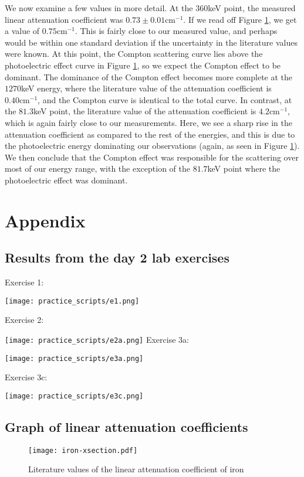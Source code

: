 \documentclass{amsart}
\begin{document}
We now examine a few values in more detail. At the $360$keV point, the measured linear attenuation coefficient was $0.73\pm0.01\text{cm}^{-1}$. If we read off Figure \ref{litiron}, we get a value of $0.75\text{cm}^{-1}$. This is fairly close to our measured value, and perhaps would be within one standard deviation if the uncertainty in the literature values were known. At this point, the Compton scattering curve lies above the photoelectric effect curve in Figure \ref{litiron}, so we expect the Compton effect to be dominant. The dominance of the Compton effect becomes more complete at the $1270$keV energy, where the literature value of the attenuation coefficient is $0.40\text{cm}^{-1}$, and the Compton curve is identical to the total curve. In contrast, at the $81.3$keV point, the literature value of the attenuation coefficient is $4.2\text{cm}^{-1}$, which is again fairly close to our measurements. Here, we see a sharp rise in the attenuation coefficient as compared to the rest of the energies, and this is due to the photoelectric energy dominating our observations (again, as seen in Figure \ref{litiron}). We then conclude that the Compton effect was responsible for the scattering over most of our energy range, with the exception of the $81.7$keV point where the photoelectric effect was dominant.
\newpage
\section{Appendix}
\subsection{Results from the day 2 lab exercises}
Exercise 1:

\texttt{[image: practice\_scripts/e1.png]}

Exercise 2:

\texttt{[image: practice\_scripts/e2a.png]}
\newpage
Exercise 3a:

\texttt{[image: practice\_scripts/e3a.png]}

Exercise 3c:

\texttt{[image: practice\_scripts/e3c.png]}
\subsection{Graph of linear attenuation coefficients}
\begin{figure}
\center
\nopagebreak
\texttt{[image: iron-xsection.pdf]}
\caption{Literature values of the linear attenuation coefficient of iron}
\label{litiron}
\end{figure}
\newpage
\end{document}
